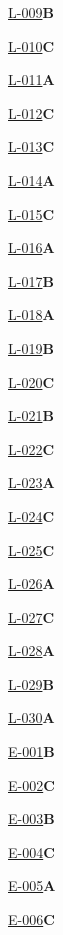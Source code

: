 \noindent\hyperref[q:L-009]{L-009}\hfill\textbf{B}\par
\noindent\hyperref[q:L-010]{L-010}\hfill\textbf{C}\par
\noindent\hyperref[q:L-011]{L-011}\hfill\textbf{A}\par
\noindent\hyperref[q:L-012]{L-012}\hfill\textbf{C}\par
\noindent\hyperref[q:L-013]{L-013}\hfill\textbf{C}\par
\noindent\hyperref[q:L-014]{L-014}\hfill\textbf{A}\par
\noindent\hyperref[q:L-015]{L-015}\hfill\textbf{C}\par
\noindent\hyperref[q:L-016]{L-016}\hfill\textbf{A}\par
\noindent\hyperref[q:L-017]{L-017}\hfill\textbf{B}\par
\noindent\hyperref[q:L-018]{L-018}\hfill\textbf{A}\par
\noindent\hyperref[q:L-019]{L-019}\hfill\textbf{B}\par
\noindent\hyperref[q:L-020]{L-020}\hfill\textbf{C}\par
\noindent\hyperref[q:L-021]{L-021}\hfill\textbf{B}\par
\noindent\hyperref[q:L-022]{L-022}\hfill\textbf{C}\par
\noindent\hyperref[q:L-023]{L-023}\hfill\textbf{A}\par
\noindent\hyperref[q:L-024]{L-024}\hfill\textbf{C}\par
\noindent\hyperref[q:L-025]{L-025}\hfill\textbf{C}\par
\noindent\hyperref[q:L-026]{L-026}\hfill\textbf{A}\par
\noindent\hyperref[q:L-027]{L-027}\hfill\textbf{C}\par
\noindent\hyperref[q:L-028]{L-028}\hfill\textbf{A}\par
\noindent\hyperref[q:L-029]{L-029}\hfill\textbf{B}\par
\noindent\hyperref[q:L-030]{L-030}\hfill\textbf{A}\par
\noindent\hyperref[q:E-001]{E-001}\hfill\textbf{B}\par
\noindent\hyperref[q:E-002]{E-002}\hfill\textbf{C}\par
\noindent\hyperref[q:E-003]{E-003}\hfill\textbf{B}\par
\noindent\hyperref[q:E-004]{E-004}\hfill\textbf{C}\par
\noindent\hyperref[q:E-005]{E-005}\hfill\textbf{A}\par
\noindent\hyperref[q:E-006]{E-006}\hfill\textbf{C}\par
